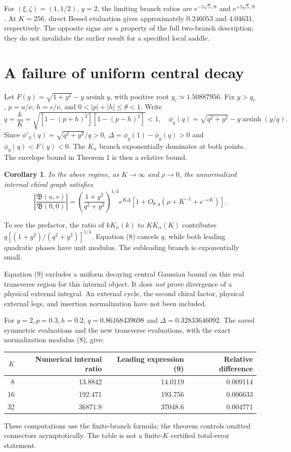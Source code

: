 \documentclass[11pt,a4paper]{article}
\newtheorem{corollary}{Corollary}
\begin{document}
For \((\xi,\zeta)=(1,1/2)\), \(y=2\), the limiting branch ratios
are \(e^{-5\sqrt5/8}\) and \(e^{+5\sqrt5/8}\).
At \(K=256\), direct Bessel evaluation gives approximately
\(0.246053\) and \(4.04631\), respectively.
The opposite signs are a property of the full two-branch description;
they do not invalidate the earlier result for a specified local saddle.

\newpage
\section{A failure of uniform central decay}
Let \(F(y)=\sqrt{1+y^2}-y\operatorname{arsinh}y\), with positive root
\(y_c\simeq1.50887956\).
Fix \(y>y_c\), \(p=u/\nu\), \(h=v/\nu\), and
\(0<|p|+|h|\le\theta<1\).
Write
\[
 q=\frac kK=\sqrt{[1-(p+h)^2][1-(p-h)^2]}<1,\quad
 \phi_y(q)=\sqrt{q^2+y^2}-y\operatorname{arsinh}(y/q).
\]
Since \(\phi'_y(q)=\sqrt{q^2+y^2}/q>0\),
\(\Delta=\phi_y(1)-\phi_y(q)>0\) and
\(\phi_y(q)<F(y)<0\).
The \(K_\alpha\) branch exponentially dominates at both points.
The envelope bound in Theorem 1 is then a relative bound.

\begin{corollary}
In the above regime, as \(K\to\infty\) and \(\rho\to0\),
the unnormalized internal chiral graph satisfies
\[
 \left|\frac{\mathfrak B(u,v)}{\mathfrak B(0,0)}\right|
 =\left(\frac{1+y^2}{q^2+y^2}\right)^{1/4}
 e^{K\Delta}\left[1+O_{\theta,y}(\rho+K^{-1}+e^{-cK})\right].
                                                                    \tag{9}
\]
\end{corollary}
To see the prefactor, the ratio of \(kK_\alpha(k)\) to
\(KK_\alpha(K)\) contributes
\(q[(1+y^2)/(q^2+y^2)]^{1/4}\).
Equation (8) cancels \(q\), while both leading quadratic phases have
unit modulus. The subleading branch is exponentially small.

Equation (9) excludes a uniform decaying central Gaussian bound on
this real transverse region for this internal object.
It does \emph{not} prove divergence of a physical external integral.
An external cycle, the second chiral factor, physical external legs,
and insertion normalization have not been included.

For \(y=2,p=0.3,h=0.2\),
\(q=0.86168439698\) and \(\Delta=0.32833646092\).
The saved symmetric evaluations and the new transverse evaluations,
with the exact normalization modulus (8), give:
\begin{center}
\begin{tabular}{rrrr}
\toprule
\(K\)&Numerical internal ratio&Leading expression (9)&Relative difference\\
\midrule
8&13.8842&14.0119&0.009114\\
16&192.471&193.756&0.006633\\
32&36871.8&37048.6&0.004771\\
\bottomrule
\end{tabular}
\end{center}
These computations use the finite-branch formula; the theorem controls
omitted connectors asymptotically. The table is not a finite-\(K\)
certified total-error statement.
\end{document}
